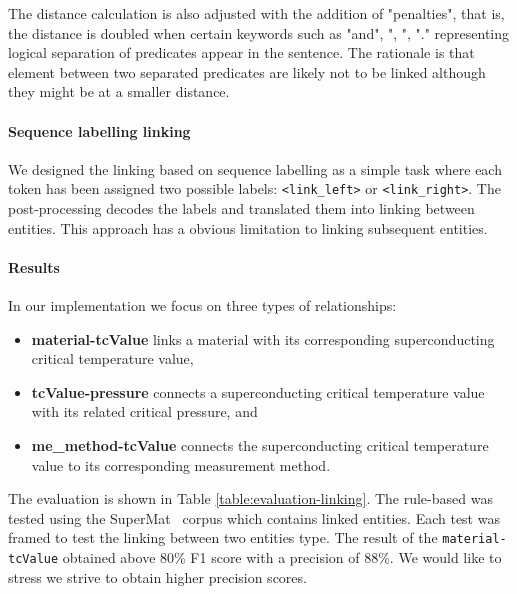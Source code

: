 \documentclass{article}
\begin{document}
The distance calculation is also adjusted with the addition of "penalties", that is, the distance is doubled when certain keywords such as "and", ", ", "." representing logical separation of predicates appear in the sentence. The rationale is that element between two separated predicates are likely not to be linked although they might be at a smaller distance. 

\paragraph{Sequence labelling linking} We designed the linking based on sequence labelling as a simple task where each token has been assigned two possible labels: \texttt{<link\_left>} or \texttt{<link\_right>}. The post-processing decodes the labels and translated them into linking between entities. 
This approach has a obvious limitation to linking subsequent entities.  

\paragraph{Results} In our implementation we focus on three types of relationships: 
\begin{itemize}
    \item \textbf{material-tcValue} links a material with its corresponding superconducting critical temperature value, 
    \item \textbf{tcValue-pressure} connects a superconducting critical temperature value with its related critical pressure, and 
    \item \textbf{me\_method-tcValue} connects the superconducting critical temperature value to its corresponding measurement method.
\end{itemize}

The evaluation is shown in Table \ref{table:evaluation-linking}. 
The rule-based was tested using the SuperMat~\cite{foppiano2021supermat} corpus which contains linked entities. Each test was framed to test the linking between two entities type. 
The result of the \texttt{material-tcValue} obtained above 80\% F1 score with a precision of 88\%. We would like to stress we strive to obtain higher precision scores. 
\end{document}
